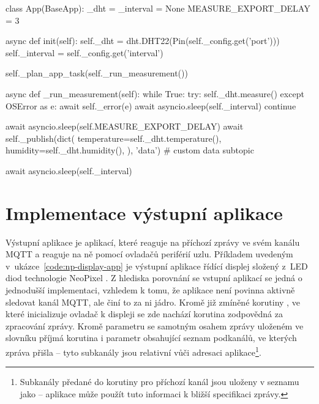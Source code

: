 \begin{code}[
    language=Python,
    caption={Implementace vstupní aplikace pro měření teploty a vlhkosti pomocí senzoru DHT -- inicializační metoda
    \ic{init} načítá parametry z přijaté konfigurace a inicializuje řadič pro DHT senzor.
    Asynchronní měřící smyčka následně požádá ovladač o změření, počká a vyexportuje data.
    \textit{Kód aplikace je pro zachování jednoduchosti zkrácen a upraven.}},
    label=code:dht-sensor-app
]
class App(BaseApp):
    _dht = _interval = None
    MEASURE_EXPORT_DELAY = 3

    async def init(self):
        self._dht = dht.DHT22(Pin(self._config.get('port')))
        self._interval = self._config.get('interval')

        self._plan_app_task(self._run_measurement())

    async def _run_measurement(self):
        while True:
            try:
                self._dht.measure()
            except OSError as e:
                await self._error(e)
                await asyncio.sleep(self._interval)
                continue

            await asyncio.sleep(self.MEASURE_EXPORT_DELAY)
            await self._publish(dict(
                temperature=self._dht.temperature(),
                humidity=self._dht.humidity(),
            ), 'data')  # custom data subtopic

            await asyncio.sleep(self._interval)
\end{code}

\section{Implementace výstupní aplikace}\label{subsec:implementace-vystupni-aplikace}

Výstupní aplikace je aplikací, které reaguje na příchozí zprávy ve svém kanálu MQTT a reaguje na ně pomocí ovladačů
periférií uzlu. Příkladem uvedeným v~ukázce~\ref{code:np-display-app} je výstupní aplikace řídící displej složený z~LED
diod technologie NeoPixel \cite{Esp32KolbansBook}.
Z hlediska porovnání se vstupní aplikací se jedná o jednodušší implementaci, vzhledem k tomu, že aplikace není povinna
aktivně sledovat kanál MQTT, ale činí to za ni jádro. Kromě již zmíněné korutiny , ve které inicializuje
ovladač k displeji se zde nachází korutina  zodpovědná za zpracování zprávy.
Kromě parametru  se samotným osahem zprávy uloženém ve slovníku příjmá korutina i parametr obsahující
seznam podkanálů, ve kterých zpráva přišla -- tyto subkanály jsou relativní vůči adresaci aplikace\footnote{Subkanály
předané do korutiny  pro příchozí kanál  jsou uloženy v seznamu
jako  -- aplikace může použít tuto informaci k bližší specifikaci zprávy.}.

